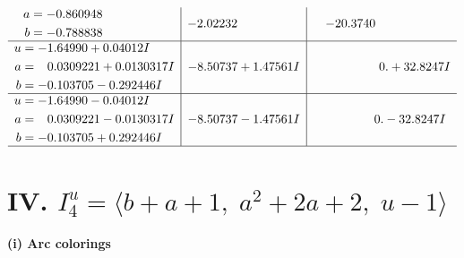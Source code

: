 \documentclass[1p]{elsarticle_modified}
\theoremstyle{definition}
\begin{document}
$$\begin{array}{c|c|c}
\begin{aligned}
a &= -0.860948\phantom{ +0.000000I} \\
b &= -0.788838\phantom{ +0.000000I}\end{aligned}
 & -2.02232\phantom{ +0.000000I} & -20.3740\phantom{ +0.000000I} \\ \hline\begin{aligned}
u &= -1.64990 + 0.04012 I \\
a &= \phantom{-}0.0309221 + 0.0130317 I \\
b &= -0.103705 - 0.292446 I\end{aligned}
 & -8.50737 + 1.47561 I & \phantom{-0.000000 -}0. + 32.8247 I \\ \hline\begin{aligned}
u &= -1.64990 - 0.04012 I \\
a &= \phantom{-}0.0309221 - 0.0130317 I \\
b &= -0.103705 + 0.292446 I\end{aligned}
 & -8.50737 - 1.47561 I & \phantom{-0.000000 } 0. - 32.8247 I\\
 \hline 
 \end{array}$$\newpage\newpage\renewcommand{\arraystretch}{1}
\centering \section*{IV. $I^u_{4}= \langle b+a+1,\;a^2+2 a+2,\;u-1 \rangle$}
\flushleft \textbf{(i) Arc colorings}\\
\end{document}
